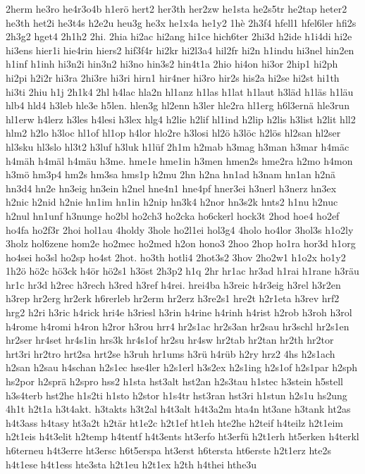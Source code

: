 {2herm
he3ro
he4r3o4b
h1erö
hert2
her3th
her2zw
he1sta
he2s5tr
he2tap
heter2
he3th
het2i
he3t4s
h2e2u
heu3g
he3x
he1x4a
he1y2
1hè
2h3f4
hfell1
hfel6ler
hfi2s
2h3g2
hget4
2h1h2
2hi.
2hia
hi2ac
hi2ang
hi1ce
hich6ter
2hi3d
h2ide
h1i4di
hi2e
hi3ens
hier1i
hie4rin
hiers2
hif3f4r
hi2kr
hi2l3a4
hil2fr
hi2n
h1indu
hi3nel
hin2en
h1inf
h1inh
hi3n2i
hin3n2
hi3no
hin3s2
hin4t1a
2hio
hi4on
hi3or
2hip1
hi2ph
hi2pi
h2i2r
hi3ra
2hi3re
hi3ri
hirn1
hir4ner
hi3ro
hir2s
his2a
hi2se
hi2st
hi1th
hi3ti
2hiu
h1j
2h1k4
2hl
h4lac
hla2n
hl1anz
h1las
h1lat
h1laut
h3läd
h1läs
h1läu
hlb4
hld4
h3leb
hle3e
h5len.
hlen3g
hl2enn
h3ler
hle2ra
hl1erg
h6l3ernä
hle3run
hl1erw
h4lerz
h3les
h4lesi
h3lex
hlg4
h2lie
h2lif
hl1ind
h2lip
h2lis
h3list
h2lit
hll2
hlm2
h2lo
h3loc
hl1of
hl1op
h4lor
hlo2re
h3losi
hl2ö
h3löc
h2lös
hl2san
hl2ser
hl3sku
hl3slo
hl3t2
h3luf
h3luk
h1lüf
2h1m
h2mab
h3mag
h3man
h3mar
h4mäc
h4mäh
h4mäl
h4mäu
h3me.
hme1e
hme1in
h3men
hmen2s
hme2ra
h2mo
h4mon
h3mö
hm3p4
hm2s
hm3sa
hms1p
h2mu
2hn
h2na
hn1ad
h3nam
hn1an
h2nä
hn3d4
hn2e
hn3eig
hn3ein
h2nel
hne4n1
hne4pf
hner3ei
h3nerl
h3nerz
hn3ex
h2nic
h2nid
h2nie
hn1im
hn1in
h2nip
hn3k4
h2nor
hn3s2k
hnts2
h1nu
h2nuc
h2nul
hn1unf
h3nunge
ho2bl
ho2ch3
ho2cka
ho6ckerl
hock3t
2hod
hoe4
ho2ef
ho4fa
ho2f3r
2hoi
hol1au
4holdy
3hole
ho2l1ei
hol3g4
4holo
ho4lor
3hol3s
h1o2ly
3holz
hol6zene
hom2e
ho2mec
ho2med
h2on
hono3
2hoo
2hop
ho1ra
hor3d
h1org
ho4sei
ho3sl
ho2sp
ho4st
2hot.
ho3th
hotli4
2hot3s2
3hov
2ho2w1
h1o2x
ho1y2
1h2ö
hö2c
hö3ck
h4ör
hö2s1
h3öst
2h3p2
h1q
2hr
hr1ac
hr3ad
h1rai
h1rane
h3räu
hr1c
hr3d
h2rec
h3rech
h3red
h3ref
h4rei.
hrei4ba
h3reic
h4r3eig
h3rel
h3r2en
h3rep
hr2erg
hr2erk
h6rerleb
hr2erm
hr2erz
h3re2s1
hre2t
h2r1eta
h3rev
hrf2
hrg2
h2ri
h3ric
h4rick
hri4e
h3riesl
h3rin
h4rine
h4rinh
h4rist
h2rob
h3roh
h3rol
h4rome
h4romi
h4ron
h2ror
h3rou
hrr4
hr2s1ac
hr2s3an
hr2sau
hr3schl
hr2s1en
hr2ser
hr4set
hr4s1in
hrs3k
hr4s1of
hr2su
hr4sw
hr2tab
hr2tan
hr2th
hr2tor
hrt3ri
hr2tro
hrt2sa
hrt2se
h3ruh
hr1ums
h3rü
h4rüb
h2ry
hrz2
4hs
h2s1ach
h2san
h2sau
h4schan
h2s1ec
hse4ler
h2s1erl
h3s2ex
h2s1ing
h2s1of
h2s1par
h2sph
hs2por
h2sprä
h2spro
hss2
h1sta
hst3alt
hst2an
h2s3tau
h1stec
h3stein
h5stell
h3s4terb
hst2he
h1s2ti
h1sto
h2stor
h1s4tr
hst3ran
hst3ri
h1stun
h2s1u
hs2ung
4h1t
h2t1a
h3t4akt.
h3takts
h3t2al
h4t3alt
h4t3a2m
hta4n
ht3ane
h3tank
ht2as
h4t3ass
h4tasy
ht3a2t
h2tär
ht1e2c
h2t1ef
ht1eh
hte2he
h2teif
h4teilz
h2t1eim
h2t1eis
h4t3elit
h2temp
h4tentf
h4t3ents
ht3erfo
ht3erfü
h2t1erh
ht5erken
h4terkl
h6terneu
h4t3erre
ht3ersc
h6t5erspa
ht3erst
h6tersta
ht6erste
h2t1erz
hte2s
h4t1ese
h4t1ess
hte3sta
h2t1eu
h2t1ex
h2th
h4thei
hthe3u
}
